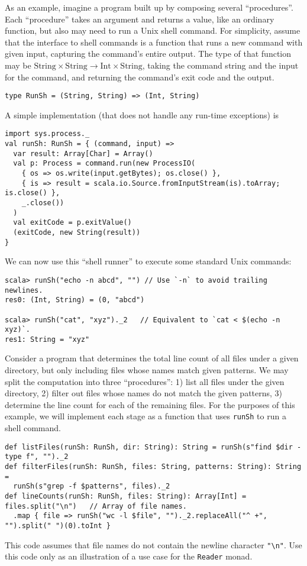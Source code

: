 As an example, imagine a program built up by composing several \textsf{``}procedures\textsf{''}.
Each \textsf{``}procedure\textsf{''} takes an argument and returns a value, like an
ordinary function, but also may need to run a Unix shell command.
For simplicity, assume that the interface to shell commands is a function
that runs a new command with given input, capturing the command\textsf{'}s
entire output. The type of that function may be $\text{String}\times\text{String}\rightarrow\text{Int}\times\text{String}$,
taking the command string and the input for the command, and returning
the command\textsf{'}s exit code and the output.
\begin{lstlisting}
type RunSh = (String, String) => (Int, String)
\end{lstlisting}
A simple implementation (that does not handle any run-time exceptions)
is
\begin{lstlisting}
import sys.process._
val runSh: RunSh = { (command, input) =>
  var result: Array[Char] = Array()
  val p: Process = command.run(new ProcessIO(
    { os => os.write(input.getBytes); os.close() },
    { is => result = scala.io.Source.fromInputStream(is).toArray; is.close() },
    _.close())
  )
  val exitCode = p.exitValue()
  (exitCode, new String(result))
}
\end{lstlisting}
We can now use this \textsf{``}shell runner\textsf{''} to execute some standard Unix
commands:
\begin{lstlisting}
scala> runSh("echo -n abcd", "") // Use `-n` to avoid trailing newlines.
res0: (Int, String) = (0, "abcd")

scala> runSh("cat", "xyz")._2   // Equivalent to `cat < $(echo -n xyz)`.
res1: String = "xyz"
\end{lstlisting}

Consider a program that determines the total line count of all files
under a given directory, but only including files whose names match
given patterns. We may split the computation into three \textsf{``}procedures\textsf{''}:
1) list all files under the given directory, 2) filter out files whose
names do not match the given patterns, 3) determine the line count
for each of the remaining files. For the purposes of this example,
we will implement each stage as a function that uses \lstinline!runSh!
to run a shell command.
\begin{lstlisting}
def listFiles(runSh: RunSh, dir: String): String = runSh(s"find $dir -type f", "")._2
def filterFiles(runSh: RunSh, files: String, patterns: String): String =
  runSh(s"grep -f $patterns", files)._2
def lineCounts(runSh: RunSh, files: String): Array[Int] = files.split("\n")   // Array of file names.
  .map { file => runSh("wc -l $file", "")._2.replaceAll("^ +", "").split(" ")(0).toInt }
\end{lstlisting}
This code assumes that file names do not contain the newline character
\lstinline!"\n"!. Use this code only as an illustration of a use
case for the \lstinline!Reader! monad.

